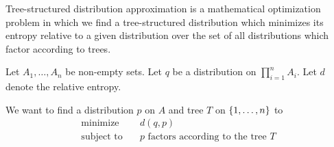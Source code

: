 
\sbasic

























\sstart
{}



Tree-structured distribution
approximation is a mathematical
optimization problem in which we
find a tree-structured distribution
which minimizes its entropy relative
to a given distribution over the set
of all distributions which factor
according to trees.


Let $A_1, \dots, A_n$ be
non-empty sets.
Let $q$ be a distribution on
$\prod_{i = 1}^{n} A_i$.
Let $d$ denote the relative
entropy.

We want to find a distribution $p$
on $A$ and tree $T$ on
$\{1, \dots, n\}$ to
\[
  \begin{aligned}
    \text{minimize}   &\quad d(q, p) \\
    \text{subject to} &\quad p \text{ factors according to the tree } T
  \end{aligned}
\]
\strats
